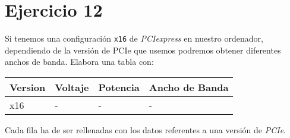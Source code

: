 \documentclass[11pt]{article}
\begin{document}
\section{Ejercicio 12}
\label{sec:org04f21b4}

Si tenemos una configuración \texttt{x16} de \emph{PCIexpress} en nuestro ordenador,
dependiendo de la versión de PCIe que usemos podremos obtener diferentes
anchos de banda. Elabora una tabla con:

\begin{center}
\begin{tabular}{llll}
Version & Voltaje & Potencia & Ancho de Banda\\
\hline
x16 & - & - & -\\
\end{tabular}
\end{center}


Cada fila ha de ser rellenadas con los datos referentes a una versión de \emph{PCIe}.
\end{document}
